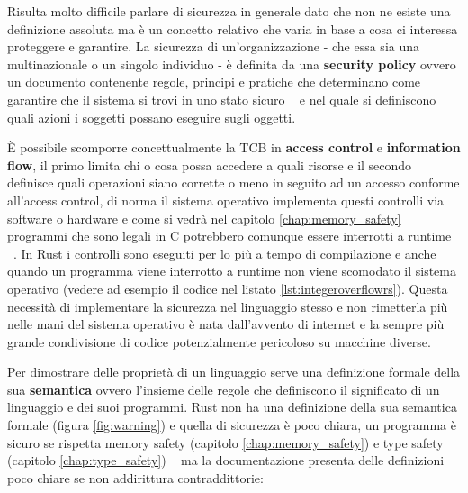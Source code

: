 \documentclass[Lau,binding=0.6cm]{sapthesis}
\begin{document}
Risulta molto difficile parlare di sicurezza in generale dato che non ne esiste una definizione assoluta ma è un concetto relativo che varia in base a cosa ci interessa proteggere e garantire. 
La sicurezza di un'organizzazione - che essa sia una multinazionale o un singolo individuo - è definita da una \textbf{security policy} ovvero un documento contenente regole, principi e pratiche che determinano come garantire che il sistema si trovi in uno stato sicuro ~\cite{milner:type_polymorphism} e nel quale si definiscono quali azioni i soggetti possano eseguire sugli oggetti. 

È possibile scomporre concettualmente la TCB in \textbf{access control} e \textbf{information flow}, il primo limita chi o cosa possa accedere a quali risorse e il secondo definisce quali operazioni siano corrette o meno in seguito ad un accesso conforme all'access control, di norma il sistema operativo implementa questi controlli via software o hardware e come si vedrà nel capitolo \ref{chap:memory_safety} programmi che sono legali in C potrebbero comunque essere interrotti a runtime ~\cite{nino:security_programming_language}.
In Rust i controlli sono eseguiti per lo più a tempo di compilazione e anche quando un programma viene interrotto a runtime non viene scomodato il sistema operativo (vedere ad esempio il codice nel listato \ref{lst:integeroverflowrs}). 
Questa necessità di implementare la sicurezza nel linguaggio stesso e non rimetterla più nelle mani del sistema operativo è nata dall'avvento di internet e la sempre più grande condivisione di codice potenzialmente pericoloso su macchine diverse.

Per dimostrare delle proprietà di un linguaggio serve una definizione formale della sua \textbf{semantica} ovvero l'insieme delle regole che definiscono il significato di un linguaggio e dei suoi programmi.
Rust non ha una definizione della sua semantica formale (figura \ref{fig:warning}) e quella di sicurezza è poco chiara, un programma è sicuro se rispetta memory safety (capitolo \ref{chap:memory_safety}) e type safety (capitolo \ref{chap:type_safety}) ~\cite[14]{rust:reference} ma la documentazione presenta delle definizioni poco chiare se non addirittura contraddittorie: 

\vspace{5mm}
\end{document}
